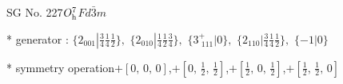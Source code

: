 \documentclass[fleqn,8pt]{jsarticle}
\begin{document}
\setcounter{MaxMatrixCols}{32}

\renewcommand{\tablename}{Table~}
\renewcommand{\figurename}{Figure~}
\begin{center}
\LARGE
SG No. 227\quad$O_{\rm h}^{7}$\quad$Fd\bar{3}m$\quad[ cubic ]
\end{center}

* generator : $\{2{}_{001}|\frac{3}{4} \frac{1}{4} \frac{1}{2}\},\,\,\{2{}_{010}|\frac{1}{4} \frac{1}{2} \frac{3}{4}\},\,\,\{3^{+}_{\,\,111}|0\},\,\,\{2{}_{110}|\frac{3}{4} \frac{1}{4} \frac{1}{2}\},\,\,\{-1|0\}$

* symmetry operation\quad$+\left[ 0,\, 0,\, 0 \right]$,\quad $+\left[ 0,\, \frac{1}{2},\, \frac{1}{2} \right]$,\quad $+\left[ \frac{1}{2},\, 0,\, \frac{1}{2} \right]$,\quad $+\left[ \frac{1}{2},\, \frac{1}{2},\, 0 \right]$
\renewcommand{\arraystretch}{1.3}
\end{document}
